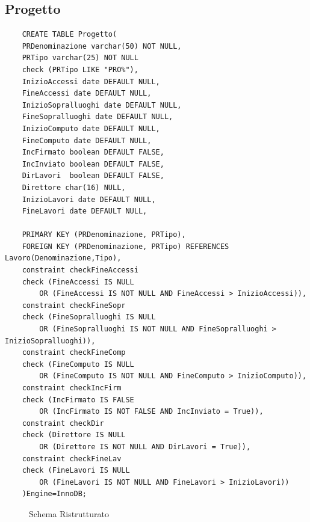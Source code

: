 \documentclass{elegantbook}
\begin{document}
\subsection{Progetto}
\begin{verbatim}
	CREATE TABLE Progetto(
	PRDenominazione varchar(50) NOT NULL,
	PRTipo varchar(25) NOT NULL
	check (PRTipo LIKE "PRO%"), 
	InizioAccessi date DEFAULT NULL,
	FineAccessi date DEFAULT NULL,
	InizioSopralluoghi date DEFAULT NULL,
	FineSopralluoghi date DEFAULT NULL,
	InizioComputo date DEFAULT NULL,
	FineComputo date DEFAULT NULL,
	IncFirmato boolean DEFAULT FALSE,
	IncInviato boolean DEFAULT FALSE,
	DirLavori  boolean DEFAULT FALSE,
	Direttore char(16) NULL,
	InizioLavori date DEFAULT NULL,
	FineLavori date DEFAULT NULL,
	
	PRIMARY KEY (PRDenominazione, PRTipo),
	FOREIGN KEY (PRDenominazione, PRTipo) REFERENCES Lavoro(Denominazione,Tipo),
	constraint checkFineAccessi 
	check (FineAccessi IS NULL 
		OR (FineAccessi IS NOT NULL AND FineAccessi > InizioAccessi)),
	constraint checkFineSopr 
	check (FineSopralluoghi IS NULL 
		OR (FineSopralluoghi IS NOT NULL AND FineSopralluoghi > InizioSopralluoghi)),
	constraint checkFineComp 
	check (FineComputo IS NULL 
		OR (FineComputo IS NOT NULL AND FineComputo > InizioComputo)),
	constraint checkIncFirm 
	check (IncFirmato IS FALSE 
		OR (IncFirmato IS NOT FALSE AND IncInviato = True)),
	constraint checkDir
	check (Direttore IS NULL 
		OR (Direttore IS NOT NULL AND DirLavori = True)),
	constraint checkFineLav 
	check (FineLavori IS NULL 
		OR (FineLavori IS NOT NULL AND FineLavori > InizioLavori))
	)Engine=InnoDB;
\end{verbatim}
\begin{figure}[H]
	\centering
	\caption{Schema Ristrutturato}
\end{figure}
\end{document}
